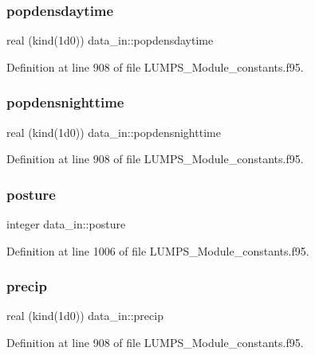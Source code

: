 \subsubsection{\texorpdfstring{popdensdaytime}{popdensdaytime}}
{\footnotesize\ttfamily real (kind(1d0)) data\+\_\+in\+::popdensdaytime}



Definition at line 908 of file L\+U\+M\+P\+S\+\_\+\+Module\+\_\+constants.\+f95.

\mbox{\label{namespacedata__in_a6b29a851fa3dca9d854a9078a37ad349}} 
\subsubsection{\texorpdfstring{popdensnighttime}{popdensnighttime}}
{\footnotesize\ttfamily real (kind(1d0)) data\+\_\+in\+::popdensnighttime}



Definition at line 908 of file L\+U\+M\+P\+S\+\_\+\+Module\+\_\+constants.\+f95.

\mbox{\label{namespacedata__in_acf23439514c76b06ead9eb622e0dde05}} 
\subsubsection{\texorpdfstring{posture}{posture}}
{\footnotesize\ttfamily integer data\+\_\+in\+::posture}



Definition at line 1006 of file L\+U\+M\+P\+S\+\_\+\+Module\+\_\+constants.\+f95.

\mbox{\label{namespacedata__in_affc86dfcf91974ff6d1768ff3b4406c3}} 
\subsubsection{\texorpdfstring{precip}{precip}}
{\footnotesize\ttfamily real (kind(1d0)) data\+\_\+in\+::precip}



Definition at line 908 of file L\+U\+M\+P\+S\+\_\+\+Module\+\_\+constants.\+f95.


